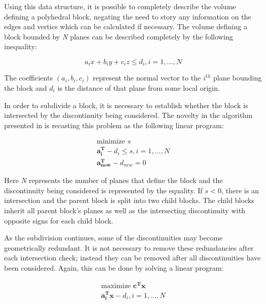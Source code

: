Using this data structure, it is possible to completely describe the volume defining a polyhedral block, negating the need to story any information on the edges and vertics which can be calculated if necessary. The volume defining a block bounded by \textit{N} planes can be described completely by the following inequality:

\begin{equation}
a_ix + b_iy + c_iz \leq d_i, i = 1,...,N 
\end{equation}

The coefficients $(a_i, b_i, c_i)$ represent the normal vector to the $i^{th}$ plane bounding the block and $d_i$ is the distance of that plane from some local origin. \par
 
In order to subdivide a block, it is necessary to establish whether the block is intersected by the discontinuity being considered. The novelty in the algorithm presented in \cite{slicing} is recasting this problem as the following linear program: \par

\begin{align} 
\text{minimize } s\\
\boldsymbol{a_{i}^{T}} - d_i \leq s, i = 1,...,N\\
\boldsymbol{a_{new}^{T}} - d_{new} = 0
\end{align}

Here \textit{N} represents the number of planes that define the block and the discontinuity being considered is represented by the equality. If $s < 0$, there is an intersection and the parent block is split into two child blocks. The child blocks inherit all parent block's planes as well as the intersecting discontinuity with opposite signs for each child block. \par

As the subdivision continues, some of the discontinuities may become geometrically redundant. It is not necessary to remove these redundancies after each intersection check; instead they can be removed after all discontinuities have been considered. Again, this can be done by solving a linear program: \par

\begin{align}
\text{maximize }\boldsymbol{c^{T} x}\\
\boldsymbol{a_{i}^{T} x} - d_{i}, i = 1,...,N
\end{align}

